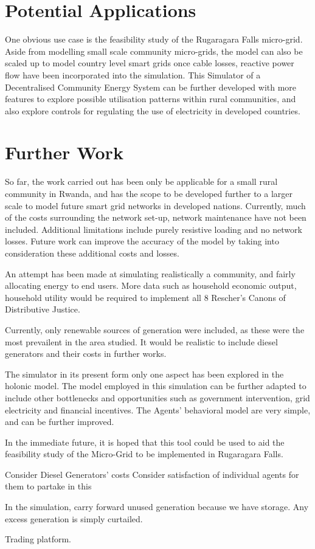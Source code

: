 \section*{Potential Applications}
One obvious use case is the feasibility study of the Rugaragara Falls micro-grid. Aside from modelling small scale community micro-grids, the model can also be scaled up to model country level smart grids once cable losses, reactive power flow have been incorporated into the simulation. 
This Simulator of a Decentralised Community Energy System can be further developed with more features to explore possible utilisation patterns within rural communities, and also explore controls for regulating the use of electricity in developed countries. 

\section*{Further Work}

So far, the work carried out has been only be applicable for a small rural community in Rwanda, and has the scope to be developed further to a larger scale to model future smart grid networks in developed nations. Currently, much of the costs surrounding the network set-up, network maintenance have not been included. Additional limitations include purely resistive loading and no network losses. Future work can improve the accuracy of the model by taking into consideration these additional costs and losses.

An attempt has been made at simulating realistically a community, and fairly allocating energy to end users. More data such as household economic output, household utility would be required to implement all 8 Rescher's Canons of Distributive Justice. 

Currently, only renewable sources of generation were included, as these were the most prevailent in the area studied. It would be realistic to include diesel generators and their costs in further works.

The simulator in its present form only one aspect has been explored in the holonic model. The model employed in this simulation can be further adapted to include other bottlenecks and opportunities such as government intervention, grid electricity and financial incentives. The Agents' behavioral model are very simple, and can be further improved.

In the immediate future, it is hoped that this tool could be used to aid the feasibility study of the Micro-Grid to be implemented in Rugaragara Falls. 

Consider Diesel Generators' costs 
Consider satisfaction of individual agents for them to partake in this

In the simulation, carry forward unused generation because we have storage. Any excess generation is simply curtailed.

Trading platform.